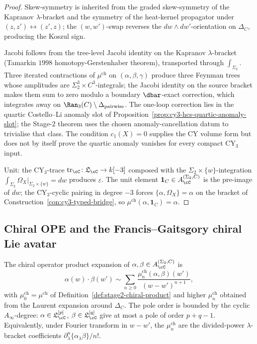\begin{proof}
Skew-symmetry is inherited from the graded skew-symmetry of the Kapranov $\lambda$-bracket and the symmetry of the heat-kernel propagator under $(z,z')\leftrightarrow(z',z)$; the $(w,w')$-swap reverses the $dw\wedge dw'$-orientation on $\Delta_C$, producing the Koszul sign.

Jacobi follows from the tree-level Jacobi identity on the Kapranov $\lambda$-bracket (Tamarkin $1998$ homotopy-Gerstenhaber theorem), transported through $\int_{\Sigma_2}$. Three iterated contractions of $\mu^{\mathrm{ch}}$ on $(\alpha,\beta,\gamma)$ produce three Feynman trees whose amplitudes are $\Sigma_2^3\times C^3$-integrals; the Jacobi identity on the source bracket makes them sum to zero modulo a boundary $\dbar$-exact correction, which integrates away on $\Ran_3(C)\setminus\Delta_{\mathrm{pairwise}}$. The one-loop correction lies in the quartic Costello--Li anomaly slot of Proposition~\ref{prop:cy3-hcs-quartic-anomaly-slot}; the Stage-$2$ theorem uses the chosen anomaly-cancellation datum to trivialise that class. The condition $c_1(X)=0$ supplies the CY volume form but does not by itself prove the quartic anomaly vanishes for every compact CY$_3$ input.

Unit: the CY$_3$-trace $\mathrm{tr}_\cC\colon\mathfrak{L}_\cC\to k[-3]$ composed with the $\Sigma_2\times\{w\}$-integration $\int_{\Sigma_2}\Omega_X|_{\Sigma_2\times\{w\}}=dw$ produces $\varepsilon$. The unit element $\mathbf 1_C\in A_\cC^{(\Sigma_2,C)}$ is the pre-image of $dw$; the CY$_3$-cyclic pairing in degree $-3$ forces $\{\alpha,\Omega_X\}=\alpha$ on the bracket of Construction~\ref{con:cy3-typed-bridge}, so $\mu^{\mathrm{ch}}(\alpha,\mathbf 1_C)=\alpha$.
\end{proof}

\subsection{Chiral OPE and the Francis--Gaitsgory chiral Lie avatar}
\label{subsec:stage2-ope-fg-avatar}

\begin{proposition}
\label{prop:stage2-chiral-ope}
The chiral operator product expansion of $\alpha,\beta\in A_\cC^{(\Sigma_2,C)}$ is
\[
 \alpha(w)\cdot\beta(w')
 \sim\sum_{n\geq 0}\frac{\mu^{\mathrm{ch}}_n(\alpha,\beta)(w')}{(w-w')^{n+1}},
\]
with $\mu^{\mathrm{ch}}_0=\mu^{\mathrm{ch}}$ of Definition~\ref{def:stage2-chiral-product} and higher $\mu^{\mathrm{ch}}_n$ obtained from the Laurent expansion around $\Delta_C$. The pole order is bounded by the cyclic $A_\infty$-degree: $\alpha\in\mathfrak{L}_\cC^{[p]}$, $\beta\in\mathfrak{L}_\cC^{[q]}$ give at most a pole of order $p+q-1$. Equivalently, under Fourier transform in $w-w'$, the $\mu^{\mathrm{ch}}_n$ are the divided-power $\lambda$-bracket coefficients $\partial_\lambda^n\{\alpha_\lambda\beta\}/n!$.
\end{proposition}

